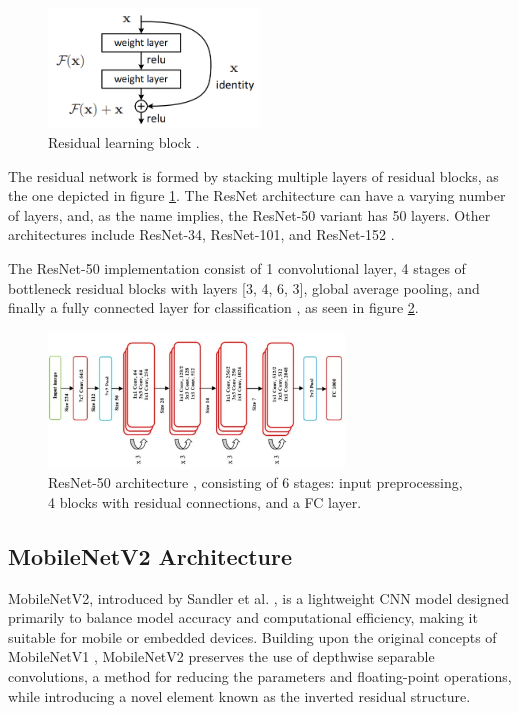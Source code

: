 \begin{figure}[ht]
    \centering
    \includegraphics[width=0.5\textwidth]{Images/res_learn.png} 
    \caption{Residual learning block \cite{he2015deepresiduallearningimage}.}
    \label{fig:res_learning}
\end{figure}

\noindent The residual network is formed by stacking multiple layers of residual blocks, as the one depicted in figure \ref{fig:res_learning}. The ResNet architecture can have a varying number of layers, and, as the name implies, the ResNet-50 variant has 50 layers. Other architectures include ResNet-34, ResNet-101, and ResNet-152 \cite{he2016identitymappingsdeepresidual}. 

The ResNet-50 implementation consist of 1 convolutional layer, 4 stages of bottleneck residual blocks with layers [3, 4, 6, 3], global average pooling, and finally a fully connected layer for classification \cite{torchvision-resnet}, as seen in figure \ref{fig:resnet50}. 

\begin{figure}[ht]
    \centering
    \includegraphics[width=0.7\textwidth]{Images/resnet50_blocks.png} 
    \caption{ResNet-50 architecture \cite{medium_resnet}, consisting of 6 stages: input preprocessing, 4 blocks with residual connections, and a FC layer.}
    \label{fig:resnet50}
\end{figure}


\subsection{MobileNetV2 Architecture}
\label{sec:mobilenet}
MobileNetV2, introduced by Sandler et al. \cite{sandler2018mobilenetv2}, is a lightweight CNN model designed primarily to balance model accuracy and computational efficiency, making it suitable for mobile or embedded devices. Building upon the original concepts of MobileNetV1 \cite{howard2017mobilenetsefficientconvolutionalneural}, MobileNetV2 preserves the use of depthwise separable convolutions, a method for reducing the parameters and floating-point operations, while introducing a novel element known as the inverted residual structure. 

